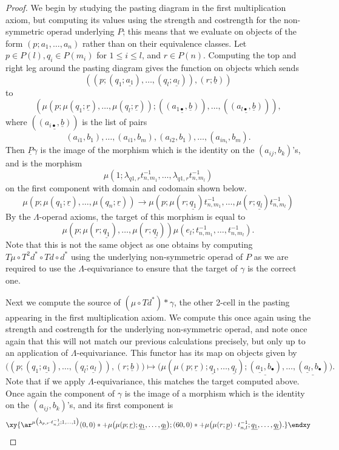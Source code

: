 \documentclass{amsbook} %
\newcommand{\un}{\underline}
\numberwithin{section}{chapter}
\begin{document}
\begin{proof}
We begin by studying the pasting diagram in the first multiplication axiom, but computing its values using the strength and costrength for the non-symmetric operad underlying $P$; this means that we evaluate on objects of the form $(p; a_{1}, \ldots, a_{n})$ rather than on their equivalence classes.  Let $p \in P(l), q_{i} \in P(m_{i})$ for $1 \leq i \leq l$, and $r \in P(n)$. Computing the top and right leg around the pasting diagram gives the function on objects which sends
\[
\left( (p; (q_{1}; \un{a_{1}}), \ldots, (q_{l}; \un{a_{l}})), (r; \un{b}) \right)
\]
to
\[
\left( \mu(p; \mu(q_{1}; \un{r}), \ldots, \mu(q_{l}; \un{r})); (\un{(a_{1\bullet}, \un{b})}), \ldots, (\un{(a_{l\bullet}, \un{b})}) \right),
\]
where $(\un{(a_{i\bullet}, \un{b})})$ is the list of pairs
\[
(a_{i1}, b_{1}), \ldots, (a_{i1}, b_{m}), (a_{i2}, b_{1}), \ldots, (a_{in_{i}}, b_{m}).
\]
Then $\un{P}\gamma$ is the image of the morphism which is the identity on the $(a_{ij}, b_{k})$'s, and is the morphism
\[
  \mu\left(1;\lambda_{q1,r}t^{-1}_{n,m_1},\ldots,\lambda_{q1,r}t^{-1}_{n,m_l}\right)
\]
on the first component with domain and codomain shown below.
\[
  \mu\left(p;\mu(q_1;\un{r}),\ldots,\mu(q_n;\un{r})\right) \longrightarrow \mu\left(p;\mu(r;\un{q_1})t^{-1}_{n,m_1},\ldots,\mu(r;\un{q_l})t^{-1}_{n,m_l}\right)
\]
By the $\Lambda$-operad axioms, the target of this morphism is equal to
\[
\mu(p; \mu(r; \un{q_{1}}), \ldots, \mu(r; \un{q_{l}}) )\mu(e_{l}; t^{-1}_{n,m_{1}}, \ldots, t^{-1}_{n,m_{l}}).
\]
Note that this is not the same object as one obtains by computing $T\mu \circ T^{2}d^{*} \circ Td \circ d^{*}$ using the underlying non-symmetric operad of $P$ as we are required to use the $\Lambda$-equivariance to ensure that the target of $\gamma$ is the correct one.

Next we compute the source of $(\mu \circ Td^{*})*\gamma$, the other 2-cell in the pasting appearing in the first multiplication axiom.  We compute this once again using the strength and costrength for the underlying non-symmetric operad, and note once again that this will not match our previous calculations precisely, but only up to an application of $\Lambda$-equivariance.  This functor has its map on objects given by
\[
 \Big( (p; (q_{1}; \un{a_{1}}), \ldots, (q_{l}; \un{a_{l}})), (r; \un{b}) \Big) \mapsto \Big(\mu(\mu(p; \un{r}); \un{q_{1}}, \ldots, \un{q_{l}}); \un{(\un{a_{1}}, b_{\bullet})}, \ldots, \un{(\un{a_{l}}, b_{\bullet})} \Big).
\]
Note that if we apply $\Lambda$-equivariance, this matches the target computed above. Once again the component of $\gamma$ is the image of a morphism which is the identity on the $(a_{ij}, b_{k})$'s, and its first component is
\[
\xy
{\ar^{\mu\big(\lambda_{p,r} \cdot t^{-1}_{n,l}; 1, \ldots, 1\big)} (0,0)*+{\mu\big(\mu(p; \un{r}); \un{q_{1}}, \ldots, \un{q_{l}}\big)}; (60,0)*+{\mu\big(\mu(r; \un{p})\cdot t^{-1}_{n,l}; \un{q_{1}}, \ldots, \un{q_{l}}\big).} }
\endxy
\]


\end{proof}
\end{document}
